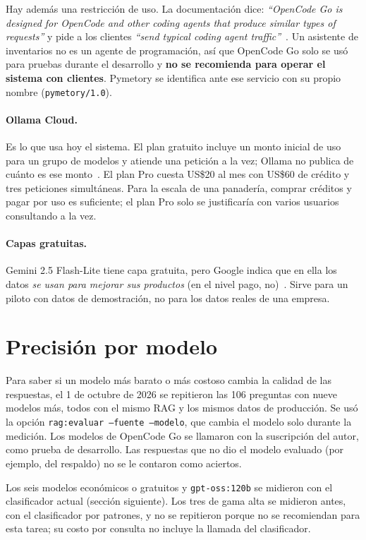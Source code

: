 \documentclass[letterpaper,11pt]{article}
\begin{document}
Hay además una restricción de uso. La documentación dice: \emph{``OpenCode Go is designed for OpenCode and other coding agents that produce similar types of requests''} y pide a los clientes \emph{``send typical coding agent traffic''}~\cite{opencodego}. Un asistente de inventarios no es un agente de programación, así que OpenCode Go solo se usó para pruebas durante el desarrollo y \textbf{no se recomienda para operar el sistema con clientes}. Pymetory se identifica ante ese servicio con su propio nombre (\texttt{pymetory/1.0}).

\paragraph{Ollama Cloud.} Es lo que usa hoy el sistema. El plan gratuito incluye un monto inicial de uso para un grupo de modelos y atiende una petición a la vez; Ollama no publica de cuánto es ese monto~\cite{ollama}. El plan Pro cuesta US\$20 al mes con US\$60 de crédito y tres peticiones simultáneas. Para la escala de una panadería, comprar créditos y pagar por uso es suficiente; el plan Pro solo se justificaría con varios usuarios consultando a la vez.

\paragraph{Capas gratuitas.} Gemini 2.5 Flash-Lite tiene capa gratuita, pero Google indica que en ella los datos \emph{se usan para mejorar sus productos} (en el nivel pago, no)~\cite{gemini}. Sirve para un piloto con datos de demostración, no para los datos reales de una empresa.

\section{Precisión por modelo}

Para saber si un modelo más barato o más costoso cambia la calidad de las respuestas, el 1 de octubre de 2026 se repitieron las 106 preguntas con nueve modelos más, todos con el mismo RAG y los mismos datos de producción. Se usó la opción \texttt{rag:evaluar --fuente --modelo}, que cambia el modelo solo durante la medición. Los modelos de OpenCode Go se llamaron con la suscripción del autor, como prueba de desarrollo. Las respuestas que no dio el modelo evaluado (por ejemplo, del respaldo) no se le contaron como aciertos.

Los seis modelos económicos o gratuitos y \texttt{gpt-oss:120b} se midieron con el clasificador actual (sección siguiente). Los tres de gama alta se midieron antes, con el clasificador por patrones, y no se repitieron porque no se recomiendan para esta tarea; su costo por consulta no incluye la llamada del clasificador.
\end{document}
